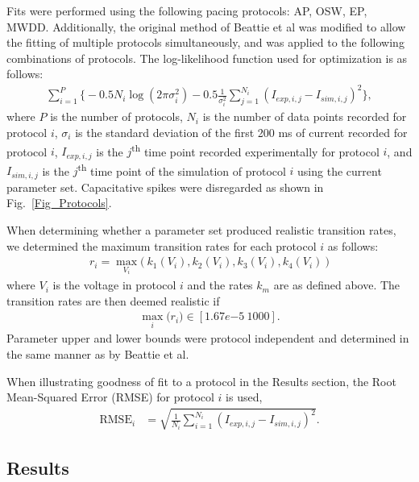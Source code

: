 \documentclass[11pt,a4paper,oneside]{article}
\begin{document}
Fits were performed using the following pacing protocols: AP, OSW, EP, MWDD. Additionally, the original method of Beattie et al was modified to allow the fitting of multiple protocols simultaneously, and was applied to the following combinations of protocols. The log-likelihood function used for optimization is as follows:
\begin{align}
\sum_{i=1}^P \Big\{ -0.5  N_i \log( 2 \pi \sigma_i^2 )-0.5 \frac{1}{\sigma_i^2}\sum_{j=1}^{N_i}(I_{exp,i,j}-I_{sim,i,j})^2 \Big\},
\end{align}
where $P$ is the number of protocols, $N_i$ is the number of data points recorded for protocol $i$, $\sigma_i$ is the standard deviation of the first 200 ms of current recorded for protocol $i$, $I_{exp,i,j}$ is the $j$\textsuperscript{th} time point recorded experimentally for protocol $i$, and $I_{sim,i,j}$ is the $j$\textsuperscript{th} time point of the simulation of protocol $i$ using the current parameter set. Capacitative spikes were disregarded as shown in Fig.~\ref{Fig_Protocols}.

When determining whether a parameter set produced realistic transition rates, we determined the maximum transition rates for each protocol $i$ as follows:
\begin{align}
r_i = \max_{V_i} \big( \ k_1(V_i), k_2(V_i), k_3(V_i), k_4(V_i) \ \big) 
\end{align}
where $V_i$ is the voltage in protocol $i$ and the rates $k_m$ are as defined above. The transition rates are then deemed realistic if 
\begin{align}
\max_i \big( r_i \big) \in \left[ 1.67e{-5} \ 1000  \right].
\end{align}
Parameter upper and lower bounds were protocol independent and determined in the same manner as by Beattie et al. 

When illustrating goodness of fit to a protocol in the Results section, the Root Mean-Squared Error (RMSE) for protocol $i$ is used,
\begin{align}
\text{RMSE}_i & = \sqrt{ \frac{1}{N_i}\sum_{i=1}^{N_i}(I_{exp,i,j}-I_{sim,i,j})^2 }.
\end{align}

\subsection{Results}
\end{document}
